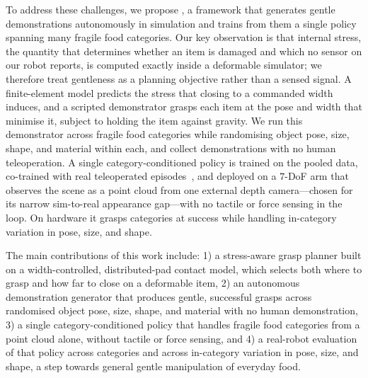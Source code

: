 To address these challenges, we propose \method, a framework that generates gentle
demonstrations autonomously in simulation and trains from them a single policy spanning many
fragile food categories. Our key observation is that internal stress, the quantity that
determines whether an item is damaged and which no sensor on our robot reports, is computed
exactly inside a deformable simulator; we therefore treat gentleness as a planning objective
rather than a sensed signal. A finite-element model predicts the stress that closing to a
commanded width induces, and a scripted demonstrator grasps each item at the pose and width
that minimise it, subject to holding the item against gravity. We run this demonstrator across
\ncats{} fragile food categories while randomising object pose, size, shape, and material within
each, and collect \ndemos{} demonstrations with no human teleoperation. A single
category-conditioned policy is trained on the pooled data, co-trained with \nreal{} real
teleoperated episodes~\cite{simrealcotrain}, and deployed on a $7$-DoF arm that observes the
scene as a point cloud from one external depth camera---chosen for its narrow sim-to-real
appearance gap---with no tactile or force sensing in the loop. On hardware it grasps \ncats{}
categories at \headline{} success while handling in-category variation in pose, size, and shape.

The main contributions of this work include: 1) a stress-aware grasp planner built on a
width-controlled, distributed-pad contact model, which selects both where to grasp and how far
to close on a deformable item, 2) an autonomous demonstration generator that produces gentle,
successful grasps across randomised object pose, size, shape, and material with no human
demonstration, 3) a single category-conditioned policy that handles \ncats{} fragile food
categories from a point cloud alone, without tactile or force sensing, and 4) a real-robot
evaluation of that policy across categories and across in-category variation in pose, size, and
shape, a step towards general gentle manipulation of everyday food.
